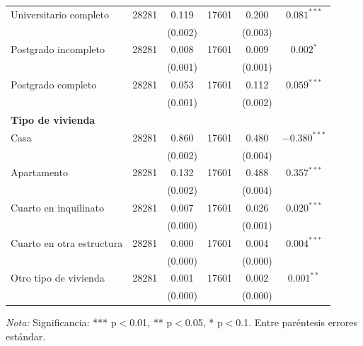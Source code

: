 \documentclass{article}
\begin{document}
\begin{table}[H]
\begin{tabular}{l c c c c c}
    Universitario completo & 28281 & 0.119 & 17601 & 0.200 & $0.081^{***}$ \\
     & & (0.002) & & (0.003) & \\
    Postgrado incompleto & 28281 & 0.008 & 17601 & 0.009 & $0.002^{*}$ \\
     & & (0.001) & & (0.001) & \\
    Postgrado completo & 28281 & 0.053 & 17601 & 0.112 & $0.059^{***}$ \\
     & & (0.001) & & (0.002) & \\
    \midrule
    \textbf{Tipo de vivienda} & & & & & \\
    Casa & 28281 & 0.860 & 17601 & 0.480 & $-0.380^{***}$ \\
     & & (0.002) & & (0.004) & \\
    Apartamento & 28281 & 0.132 & 17601 & 0.488 & $0.357^{***}$ \\
     & & (0.002) & & (0.004) & \\
    Cuarto en inquilinato & 28281 & 0.007 & 17601 & 0.026 & $0.020^{***}$ \\
     & & (0.000) & & (0.001) & \\
    Cuarto en otra estructura & 28281 & 0.000 & 17601 & 0.004 & $0.004^{***}$ \\
     & & (0.000) & & (0.000) & \\
    Otro tipo de vivienda & 28281 & 0.001 & 17601 & 0.002 & $0.001^{**}$ \\
     & & (0.000) & & (0.000) & \\
    \bottomrule
  \end{tabular}
  \parbox[t]{\textwidth}{%
    \vspace{0.5em}
    \footnotesize{\textit{Nota:} Significancia: *** p$<$0.01, ** p$<$0.05, * p$<$0.1. Entre paréntesis errores estándar.}}
\end{table}
\end{document}
